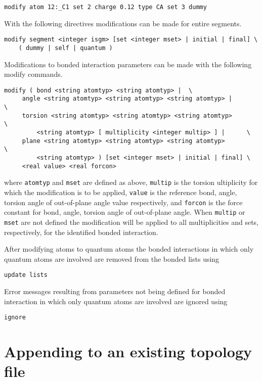 \begin{verbatim}
modify atom 12:_C1 set 2 charge 0.12 type CA set 3 dummy
\end{verbatim}

With the following directives modifications can be made for entire
segments.

\begin{verbatim}
modify segment <integer isgm> [set <integer mset> | initial | final] \
	( dummy | self | quantum )
\end{verbatim}

Modifications to bonded interaction parameters can be made with the
following modify commands.

\begin{verbatim}
modify ( bond <string atomtyp> <string atomtyp> |  \
	 angle <string atomtyp> <string atomtyp> <string atomtyp> |        \ 
 	 torsion <string atomtyp> <string atomtyp> <string atomtyp>        \
		 <string atomtyp> [ multiplicity <integer multip> ] |      \
	 plane <string atomtyp> <string atomtyp> <string atomtyp>          \
		 <string atomtyp> ) [set <integer mset> | initial | final] \
	 <real value> <real forcon>
\end{verbatim}

where \verb+atomtyp+ and \verb+mset+ are defined as above, \verb+multip+
is the torsion ultiplicity for which the modification is to be applied,
\verb+value+ is the reference bond, angle, torsion angle of out-of-plane
angle value respectively, and \verb+forcon+ is the force constant for
bond, angle, torsion angle of out-of-plane angle. When \verb+multip+
or \verb+mset+ are not defined the modification will be applied to
all multiplicities and sets, respectively, for the identified bonded
interaction.

After modifying atoms to quantum atoms the bonded interactions in which
only quantum atoms are involved are removed from the bonded lists using

\begin{verbatim}
update lists
\end{verbatim}

Error messages resulting from parameters not being defined for bonded
interaction in which only quantum atoms are involved are ignored using

\begin{verbatim}
ignore
\end{verbatim}

\section{Appending to an existing topology file}

